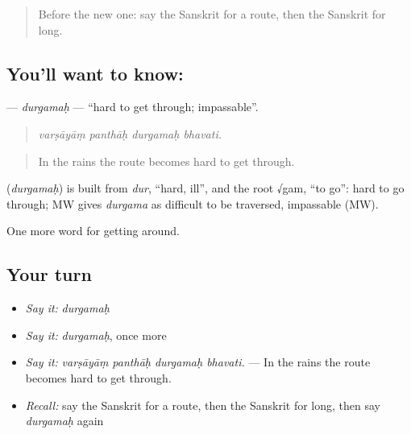 \begin{quote}
Before the new one: say the Sanskrit for a route, then the Sanskrit for long.
\end{quote}

\subsection*{You'll want to know: }
\textbf{} — \emph{durgamaḥ} — \textquotedblleft{}hard to get through; impassable\textquotedblright{}.

\begin{quote}
   
\end{quote}

\begin{quote}
\emph{varṣāyāṃ panthāḥ durgamaḥ bhavati.}
\end{quote}

\begin{quote}
In the rains the route becomes hard to get through.
\end{quote}

\begin{cousinweb}
\textbf{} (\emph{durgamaḥ}) is built from \emph{dur}, \textquotedblleft{}hard, ill\textquotedblright{}, and the root √gam, \textquotedblleft{}to go\textquotedblright{}: hard to go through; MW gives \emph{durgama} as difficult to be traversed, impassable (MW).
\end{cousinweb}

\begin{grammarlens}[title={What you've built}]
One more word for getting around.
\end{grammarlens}

\subsection*{Your turn}
\begin{itemize}
\raggedright
  \item \emph{Say it:} \emph{durgamaḥ}
  \item \emph{Say it:} \emph{durgamaḥ}, once more
  \item \emph{Say it:} \emph{varṣāyāṃ panthāḥ durgamaḥ bhavati.} — In the rains the route becomes hard to get through.
  \item \emph{Recall:} say the Sanskrit for a route, then the Sanskrit for long, then say \emph{durgamaḥ} again
\end{itemize}

